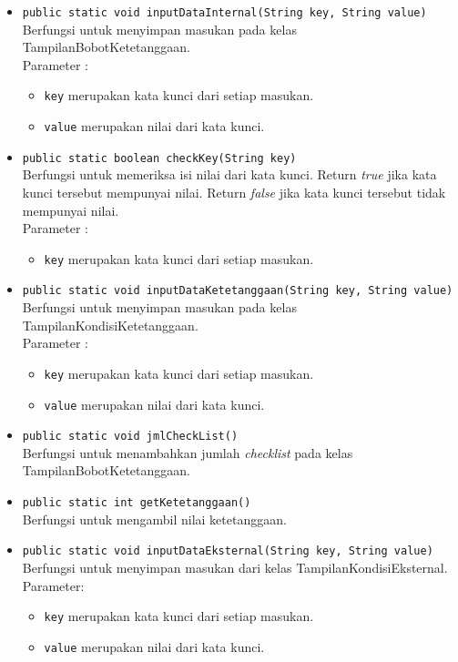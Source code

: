 	\begin{itemize}
		\item \texttt{public static void inputDataInternal(String key, String value)}\\
		Berfungsi untuk menyimpan masukan pada kelas TampilanBobotKetetanggaan.\\
		Parameter :
		\begin{itemize}
			\item \texttt{key} merupakan kata kunci dari setiap masukan.
			\item \texttt{value} merupakan nilai dari kata kunci.
		\end{itemize}
		
		\item \texttt{public static boolean checkKey(String key)}\\
		Berfungsi untuk memeriksa isi nilai dari kata kunci. Return \textit{true} jika kata kunci tersebut mempunyai nilai. Return \textit{false} jika kata kunci tersebut tidak mempunyai nilai.\\
		Parameter :
		\begin{itemize}
			\item \texttt{key} merupakan kata kunci dari setiap masukan.
		\end{itemize}
		
		\item \texttt{public static void inputDataKetetanggaan(String key, String value)}\\
		Berfungsi untuk menyimpan masukan pada kelas TampilanKondisiKetetanggaan.\\
		Parameter :
		\begin{itemize}
			\item \texttt{key} merupakan kata kunci dari setiap masukan.
			\item \texttt{value} merupakan nilai dari kata kunci.
		\end{itemize}
		
		\item \texttt{public static void jmlCheckList()}\\
		Berfungsi untuk menambahkan jumlah \textit{checklist} pada kelas TampilanBobotKetetanggaan.
		
		\item \texttt{public static int getKetetanggaan()}\\
		Berfungsi untuk mengambil nilai ketetanggaan.
		
		\item \texttt{public static void inputDataEksternal(String key, String value)}\\
		Berfungsi untuk menyimpan masukan dari kelas TampilanKondisiEksternal.\\
		Parameter:
		\begin{itemize}
			\item \texttt{key} merupakan kata kunci dari setiap masukan.
			\item \texttt{value} merupakan nilai dari kata kunci.
		\end{itemize}
		

\end{itemize}
